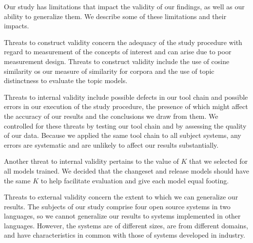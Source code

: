 
Our study has limitations that impact the validity of our findings,
as well as our ability to generalize them.
We describe some of these limitations and their impacts.

Threats to construct validity concern the adequacy of the study procedure with regard to
measurement of the concepts of interest and can arise due to poor measurement design.
Threats to construct validity include the use of cosine similarity os our measure of similarity for corpora
and the use of topic distinctness to evaluate the topic models.

Threats to internal validity include possible defects in our tool chain and possible errors
in our execution of the study procedure,
the presence of which might affect the accuracy of our results and the conclusions we draw from them.
We controlled for these threats by testing our tool chain and by assessing the quality of our data.
Because we applied the same tool chain to all subject systems, any errors are systematic and are unlikely
to affect our results substantially.

Another threat to internal validity pertains to the value of $K$ that we selected for all models trained.
We decided that the changeset and release models should have the same $K$
to help facilitate evaluation and give each model equal footing.

Threats to external validity concern the extent to which we can generalize our results.
The subjects of our study comprise four open source systems in two languages,
so we cannot generalize our results to systems implemented in other languages.
However, the systems are of different sizes, are from different domains, and
have characteristics in common with those of systems developed in industry.

